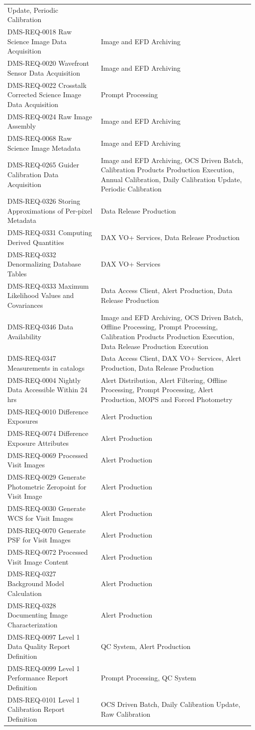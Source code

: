 \documentclass[]{article}
\begin{document}
\begin{longtable}[]{@{}ll@{}}
Update, Periodic Calibration\tabularnewline
DMS-REQ-0018 Raw Science Image Data Acquisition & Image and EFD
Archiving\tabularnewline
DMS-REQ-0020 Wavefront Sensor Data Acquisition & Image and EFD
Archiving\tabularnewline
DMS-REQ-0022 Crosstalk Corrected Science Image Data Acquisition & Prompt
Processing\tabularnewline
DMS-REQ-0024 Raw Image Assembly & Image and EFD Archiving\tabularnewline
DMS-REQ-0068 Raw Science Image Metadata & Image and EFD
Archiving\tabularnewline
DMS-REQ-0265 Guider Calibration Data Acquisition & Image and EFD
Archiving, OCS Driven Batch, Calibration Products Production Execution,
Annual Calibration, Daily Calibration Update, Periodic
Calibration\tabularnewline
DMS-REQ-0326 Storing Approximations of Per-pixel Metadata & Data Release
Production\tabularnewline
DMS-REQ-0331 Computing Derived Quantities & DAX VO+ Services, Data
Release Production\tabularnewline
DMS-REQ-0332 Denormalizing Database Tables & DAX VO+
Services\tabularnewline
DMS-REQ-0333 Maximum Likelihood Values and Covariances & Data Access
Client, Alert Production, Data Release Production\tabularnewline
DMS-REQ-0346 Data Availability & Image and EFD Archiving, OCS Driven
Batch, Offline Processing, Prompt Processing, Calibration Products
Production Execution, Data Release Production Execution\tabularnewline
DMS-REQ-0347 Measurements in catalogs & Data Access Client, DAX VO+
Services, Alert Production, Data Release Production\tabularnewline
DMS-REQ-0004 Nightly Data Accessible Within 24 hrs & Alert Distribution,
Alert Filtering, Offline Processing, Prompt Processing, Alert
Production, MOPS and Forced Photometry\tabularnewline
DMS-REQ-0010 Difference Exposures & Alert Production\tabularnewline
DMS-REQ-0074 Difference Exposure Attributes & Alert
Production\tabularnewline
DMS-REQ-0069 Processed Visit Images & Alert Production\tabularnewline
DMS-REQ-0029 Generate Photometric Zeropoint for Visit Image & Alert
Production\tabularnewline
DMS-REQ-0030 Generate WCS for Visit Images & Alert
Production\tabularnewline
DMS-REQ-0070 Generate PSF for Visit Images & Alert
Production\tabularnewline
DMS-REQ-0072 Processed Visit Image Content & Alert
Production\tabularnewline
DMS-REQ-0327 Background Model Calculation & Alert
Production\tabularnewline
DMS-REQ-0328 Documenting Image Characterization & Alert
Production\tabularnewline
DMS-REQ-0097 Level 1 Data Quality Report Definition & QC System, Alert
Production\tabularnewline
DMS-REQ-0099 Level 1 Performance Report Definition & Prompt Processing,
QC System\tabularnewline
DMS-REQ-0101 Level 1 Calibration Report Definition & OCS Driven Batch,
Daily Calibration Update, Raw Calibration\tabularnewline

\end{longtable}
\end{document}
